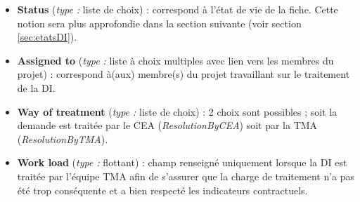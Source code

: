 \begin{itemize}[label=$\Rightarrow$, font=\LARGE]
   \item \textbf{Status} (\textit{type :} liste de choix) : correspond à l'état de vie de la fiche. Cette notion sera plus approfondie dans la section suivante (voir section \ref{sec:etatsDI}). 
   \item \textbf{Assigned to} (\textit{type :} liste à choix multiples avec lien vers les membres du projet) : correspond à(aux) membre(s) du projet travaillant sur le traitement de la DI.
   \item \textbf{Way of treatment} (\textit{type :} liste de choix) : 2 choix sont possibles ; soit la demande est traitée par le CEA (\textit{ResolutionByCEA}) soit par la TMA (\textit{ResolutionByTMA}).
   \item \textbf{Work load} (\textit{type :} flottant) : champ renseigné uniquement lorsque la DI est traitée par l'équipe TMA afin de s'assurer que la charge de traitement n'a pas été trop conséquente et a bien respecté les indicateurs contractuels.
\end{itemize}

